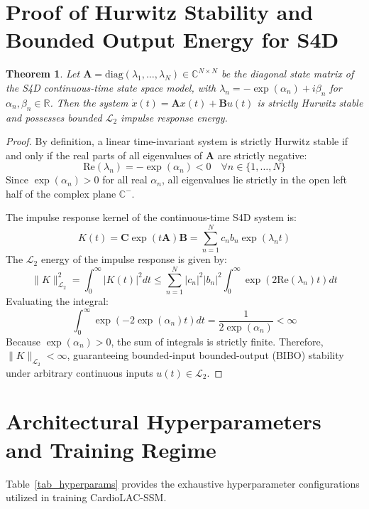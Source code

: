 \documentclass[journal]{IEEEtran}
\newtheorem{theorem}{Theorem}
\begin{document}
\section{Proof of Hurwitz Stability and Bounded Output Energy for S4D}
\label{app_stability}
\begin{theorem}
Let $\mathbf{A} = \text{diag}(\lambda_1, \dots, \lambda_N) \in \mathbb{C}^{N \times N}$ be the diagonal state matrix of the S4D continuous-time state space model, with $\lambda_n = -\exp(\alpha_n) + i\beta_n$ for $\alpha_n, \beta_n \in \mathbb{R}$. Then the system $\dot{x}(t) = \mathbf{A}x(t) + \mathbf{B}u(t)$ is strictly Hurwitz stable and possesses bounded $\mathcal{L}_2$ impulse response energy.
\end{theorem}
\begin{proof}
By definition, a linear time-invariant system is strictly Hurwitz stable if and only if the real parts of all eigenvalues of $\mathbf{A}$ are strictly negative:
\begin{equation}
    \text{Re}(\lambda_n) = -\exp(\alpha_n) < 0 \quad \forall n \in \{1, \dots, N\}
\end{equation}
Since $\exp(\alpha_n) > 0$ for all real $\alpha_n$, all eigenvalues lie strictly in the open left half of the complex plane $\mathbb{C}^-$.

The impulse response kernel of the continuous-time S4D system is:
\begin{equation}
    K(t) = \mathbf{C} \exp(t \mathbf{A}) \mathbf{B} = \sum_{n=1}^N c_n b_n \exp(\lambda_n t)
\end{equation}
The $\mathcal{L}_2$ energy of the impulse response is given by:
\begin{equation}
    \|K\|_{\mathcal{L}_2}^2 = \int_0^\infty |K(t)|^2 dt \le \sum_{n=1}^N |c_n|^2 |b_n|^2 \int_0^\infty \exp(2 \text{Re}(\lambda_n) t) dt
\end{equation}
Evaluating the integral:
\begin{equation}
    \int_0^\infty \exp(-2\exp(\alpha_n) t) dt = \frac{1}{2\exp(\alpha_n)} < \infty
\end{equation}
Because $\exp(\alpha_n) > 0$, the sum of integrals is strictly finite. Therefore, $\|K\|_{\mathcal{L}_2} < \infty$, guaranteeing bounded-input bounded-output (BIBO) stability under arbitrary continuous inputs $u(t) \in \mathcal{L}_2$.
\end{proof}

\section{Architectural Hyperparameters and Training Regime}
Table~\ref{tab_hyperparams} provides the exhaustive hyperparameter configurations utilized in training CardioLAC-SSM.
\end{document}
